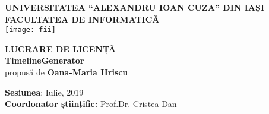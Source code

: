 \begin{titlepage}
   \begin{center}
	   \LARGE
       \textbf{UNIVERSITATEA “ALEXANDRU IOAN CUZA” DIN IAȘI}\\
 	   \textbf{FACULTATEA DE INFORMATICĂ}\\

       \vspace{1cm}
       \texttt{[image: fii]}
 
       \vspace{1.5cm}
 	   \textbf{LUCRARE DE LICENȚĂ}\\

       \textbf{TimelineGenerator}\\
	   propusă de
 	   \textbf{Oana-Maria Hriscu}
       \vfill 
       \vspace{0.8cm}
 
 
       \textbf{Sesiunea}: Iulie, 2019\\
       \textbf{Coordonator științific:} Prof.Dr. Cristea Dan
      
 
   \end{center}
\end{titlepage}